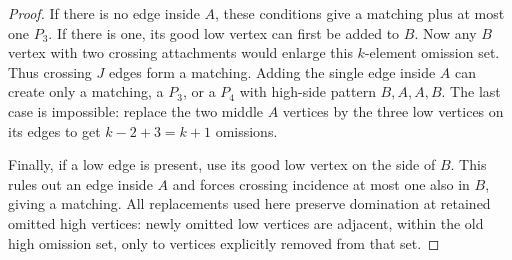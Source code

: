 \documentclass[11pt,a4paper]{article}
\theoremstyle{definition}\newtheorem{definition}[theorem]{Definition}
\theoremstyle{remark}\newtheorem{remark}[theorem]{Remark}
\begin{document}
\begin{proof}
If there is no edge inside $A$, these conditions give a matching plus
at most one $P_3$. If there is one, its good low vertex can first be
added to $B$. Now any $B$ vertex with two crossing attachments would
enlarge this $k$-element omission set. Thus crossing $J$ edges form a
matching. Adding the single edge inside $A$ can create only a matching,
a $P_3$, or a $P_4$ with high-side pattern $B,A,A,B$. The last case
is impossible: replace the two middle $A$ vertices by the three low
vertices on its edges to get $k-2+3=k+1$ omissions.

Finally, if a low edge is present, use its good low vertex on the
side of $B$. This rules out an edge inside $A$ and forces crossing
incidence at most one also in $B$, giving a matching. All replacements
used here preserve domination at retained omitted high vertices:
newly omitted low vertices are adjacent, within the old high omission
set, only to vertices explicitly removed from that set.
\end{proof}
\end{document}
